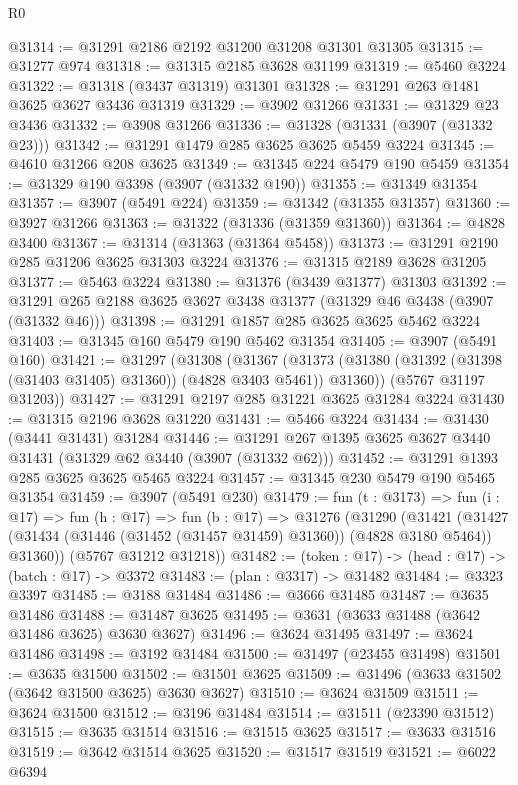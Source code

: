 \begin{lexlean}{R0}
\begin{coremodule}
@31314 := @31291 @2186 @2192 @31200 @31208 @31301 @31305
@31315 := @31277 @974
@31318 := @31315 @2185 @3628 @31199
@31319 := @5460 @3224
@31322 := @31318 (@3437 @31319) @31301
@31328 := @31291 @263 @1481 @3625 @3627 @3436 @31319
@31329 := @3902 @31266
@31331 := @31329 @23 @3436
@31332 := @3908 @31266
@31336 := @31328 (@31331 (@3907 (@31332 @23)))
@31342 := @31291 @1479 @285 @3625 @3625 @5459 @3224
@31345 := @4610 @31266 @208 @3625
@31349 := @31345 @224 @5479 @190 @5459
@31354 := @31329 @190 @3398 (@3907 (@31332 @190))
@31355 := @31349 @31354
@31357 := @3907 (@5491 @224)
@31359 := @31342 (@31355 @31357)
@31360 := @3927 @31266
@31363 := @31322 (@31336 (@31359 @31360))
@31364 := @4828 @3400
@31367 := @31314 (@31363 (@31364 @5458))
@31373 := @31291 @2190 @285 @31206 @3625 @31303 @3224
@31376 := @31315 @2189 @3628 @31205
@31377 := @5463 @3224
@31380 := @31376 (@3439 @31377) @31303
@31392 := @31291 @265 @2188 @3625 @3627 @3438 @31377 (@31329 @46 @3438 (@3907 (@31332 @46)))
@31398 := @31291 @1857 @285 @3625 @3625 @5462 @3224
@31403 := @31345 @160 @5479 @190 @5462 @31354
@31405 := @3907 (@5491 @160)
@31421 := @31297
    (@31308
      (@31367 (@31373 (@31380 (@31392 (@31398 (@31403 @31405) @31360)) (@4828 @3403 @5461)) @31360))
      (@5767 @31197 @31203))
@31427 := @31291 @2197 @285 @31221 @3625 @31284 @3224
@31430 := @31315 @2196 @3628 @31220
@31431 := @5466 @3224
@31434 := @31430 (@3441 @31431) @31284
@31446 := @31291 @267 @1395 @3625 @3627 @3440 @31431 (@31329 @62 @3440 (@3907 (@31332 @62)))
@31452 := @31291 @1393 @285 @3625 @3625 @5465 @3224
@31457 := @31345 @230 @5479 @190 @5465 @31354
@31459 := @3907 (@5491 @230)
@31479 := fun (t : @3173) =>
  fun (i : @17) =>
  fun (h : @17) =>
  fun (b : @17) =>
  @31276
    (@31290
      (@31421 (@31427 (@31434 (@31446 (@31452 (@31457 @31459) @31360)) (@4828 @3180 @5464)) @31360))
      (@5767 @31212 @31218))
@31482 := (token : @17) -> (head : @17) -> (batch : @17) -> @3372
@31483 := (plan : @3317) -> @31482
@31484 := @3323 @3397
@31485 := @3188 @31484
@31486 := @3666 @31485
@31487 := @3635 @31486
@31488 := @31487 @3625
@31495 := @3631 (@3633 @31488 (@3642 @31486 @3625) @3630 @3627)
@31496 := @3624 @31495
@31497 := @3624 @31486
@31498 := @3192 @31484
@31500 := @31497 (@23455 @31498)
@31501 := @3635 @31500
@31502 := @31501 @3625
@31509 := @31496 (@3633 @31502 (@3642 @31500 @3625) @3630 @3627)
@31510 := @3624 @31509
@31511 := @3624 @31500
@31512 := @3196 @31484
@31514 := @31511 (@23390 @31512)
@31515 := @3635 @31514
@31516 := @31515 @3625
@31517 := @3633 @31516
@31519 := @3642 @31514 @3625
@31520 := @31517 @31519
@31521 := @6022 @6394

\end{coremodule}
\end{lexlean}
